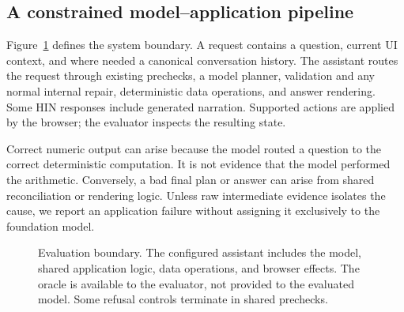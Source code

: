 \documentclass[10pt,twocolumn,letterpaper]{article}
\begin{document}
\subsection{A constrained model--application pipeline}
Figure~\ref{fig:system} defines the system boundary. A request contains a question, current UI context, and where needed a canonical conversation history. The assistant routes the request through existing prechecks, a model planner, validation and any normal internal repair, deterministic data operations, and answer rendering. Some HIN responses include generated narration. Supported actions are applied by the browser; the evaluator inspects the resulting state.

Correct numeric output can arise because the model routed a question to the correct deterministic computation. It is not evidence that the model performed the arithmetic. Conversely, a bad final plan or answer can arise from shared reconciliation or rendering logic. Unless raw intermediate evidence isolates the cause, we report an application failure without assigning it exclusively to the foundation model.

\begin{figure}[t]
\centering
{}
\caption{Evaluation boundary. The configured assistant includes the model, shared application logic, data operations, and browser effects. The oracle is available to the evaluator, not provided to the evaluated model. Some refusal controls terminate in shared prechecks.}
\label{fig:system}
\end{figure}
\end{document}
